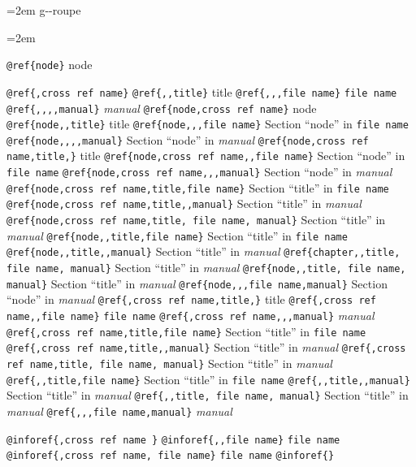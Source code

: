 \documentclass{book}
\begin{document}
\endgroup{}%
\par\begingroup\obeylines\obeyspaces\frenchspacing\leftskip=2em \parskip=0pt \parindent=0pt \ttfamily%
g{-}{-}roupe
\endgroup{}%
\par\begingroup\obeylines\obeyspaces\frenchspacing\leftskip=2em \parskip=0pt \parindent=0pt \ttfamily%

\texttt{@ref\{node\}} node

\texttt{@ref\{,cross ref name\}} 
\texttt{@ref\{,,title\}} title
\texttt{@ref\{,,,file name\}} \texttt{file name}
\texttt{@ref\{,,,,manual\}} \textsl{manual}
\texttt{@ref\{node,cross ref name\}} node
\texttt{@ref\{node,,title\}} title
\texttt{@ref\{node,,,file name\}} Section ``node'' in \texttt{file name}
\texttt{@ref\{node,,,,manual\}} Section ``node'' in \textsl{manual}
\texttt{@ref\{node,cross ref name,title,\}} title
\texttt{@ref\{node,cross ref name,,file name\}} Section ``node'' in \texttt{file name}
\texttt{@ref\{node,cross ref name,,,manual\}} Section ``node'' in \textsl{manual}
\texttt{@ref\{node,cross ref name,title,file name\}} Section ``title'' in \texttt{file name}
\texttt{@ref\{node,cross ref name,title,,manual\}} Section ``title'' in \textsl{manual}
\texttt{@ref\{node,cross ref name,title, file name, manual\}} Section ``title'' in \textsl{manual}
\texttt{@ref\{node,,title,file name\}} Section ``title'' in \texttt{file name}
\texttt{@ref\{node,,title,,manual\}} Section ``title'' in \textsl{manual}
\texttt{@ref\{chapter,,title, file name, manual\}} Section ``title'' in \textsl{manual}
\texttt{@ref\{node,,title, file name, manual\}} Section ``title'' in \textsl{manual}
\texttt{@ref\{node,,,file name,manual\}} Section ``node'' in \textsl{manual}
\texttt{@ref\{,cross ref name,title,\}} title
\texttt{@ref\{,cross ref name,,file name\}} \texttt{file name}
\texttt{@ref\{,cross ref name,,,manual\}} \textsl{manual}
\texttt{@ref\{,cross ref name,title,file name\}} Section ``title'' in \texttt{file name}
\texttt{@ref\{,cross ref name,title,,manual\}} Section ``title'' in \textsl{manual}
\texttt{@ref\{,cross ref name,title, file name, manual\}} Section ``title'' in \textsl{manual}
\texttt{@ref\{,,title,file name\}} Section ``title'' in \texttt{file name}
\texttt{@ref\{,,title,,manual\}} Section ``title'' in \textsl{manual}
\texttt{@ref\{,,title, file name, manual\}} Section ``title'' in \textsl{manual}
\texttt{@ref\{,,,file name,manual\}} \textsl{manual}

\texttt{@inforef\{,cross ref name \}} 
\texttt{@inforef\{,,file name\}} \texttt{file name}
\texttt{@inforef\{,cross ref name, file name\}} \texttt{file name}
\texttt{@inforef\{\}} 
\end{document}
